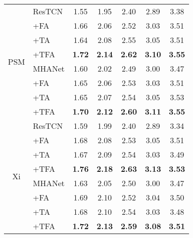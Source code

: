 \begin{table}[!h]
\begin{tabular}{@{}cl||ccccc@{}}
        \multirow{8}{*}{PSM}
        & ResTCN & 1.55 & 1.95 & 2.40 & 2.89 & 3.38 \\
        & +FA    & 1.66 & 2.06 & 2.52 & 3.03 & 3.51 \\
        & +TA    & 1.64 & 2.08 & 2.55 & 3.05 & 3.51 \\
        & +TFA   & \textbf{1.72} & \textbf{2.14} & \textbf{2.62} & \textbf{3.10} & \textbf{3.55} \\
        \cline{2-7}
        & MHANet & 1.60 & 2.02 & 2.49 & 3.00 & 3.47 \\
        & +FA    & 1.65 & 2.06 & 2.53 & 3.03 & 3.51 \\
        & +TA    & 1.65 & 2.07 & 2.54 & 3.05 & 3.53 \\
        & +TFA   & \textbf{1.70} & \textbf{2.12} & \textbf{2.60} & \textbf{3.11} & \textbf{3.55} \\
        \hline
        \hline
        
        \multirow{8}{*}{Xi}
        & ResTCN & 1.59 & 1.99 & 2.40 & 2.89 & 3.34 \\
        & +FA    & 1.68 & 2.08 & 2.53 & 3.05 & 3.51 \\
        & +TA    & 1.67 & 2.09 & 2.54 & 3.03 & 3.49 \\
        & +TFA   & \textbf{1.76} & \textbf{2.18} & \textbf{2.63} & \textbf{3.13} & \textbf{3.53}  \\
        \cline{2-7}
        & MHANet & 1.63 & 2.05 & 2.50 & 3.00 & 3.47\\
        & +FA    & 1.69 & 2.10 & 2.52 & 3.04 & 3.50\\
        & +TA    & 1.68 & 2.10 & 2.54 & 3.03 & 3.48\\
        & +TFA   & \textbf{1.72} & \textbf{2.13} & \textbf{2.59} & \textbf{3.08} & \textbf{3.51} \\
        \hline
        
    \end{tabular}
    \vspace{-0.8em}
\end{table}